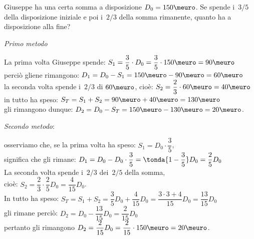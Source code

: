 \begin{esempio}{}{}
Giuseppe ha una certa somma a disposizione \(D_0 = 150\meuro\). 
Se spende i~\(3/5\) della disposizione 
iniziale e poi i~\(2/3\) della somma rimanente, 
quanto ha a disposizione alla fine?

\vspace{.5em}
\emph{Primo metodo} 

La prima volta Giuseppe spende: \quad 
\(S_1 = \dfrac{3}{5} \cdot D_0 =
  \dfrac{3}{5} \cdot 150\meuro = 90\meuro\)\\
perciò gliene rimangono: \quad 
\(D_1 = D_0 - S_1 = 150\meuro - 90\meuro = 60\meuro\) \\
la seconda volta spende i~\(2/3\) di \(60\meuro\), 
cioè: \quad \(S_2 = \dfrac{2}{3} \cdot 60\meuro = 40\meuro\) \\
in tutto ha speso: \quad 
\(S_T = S_1 + S_2 = 90\meuro + 40\meuro = 130\meuro\)\\
gli rimangono dunque: \quad 
\(D_2 = D_0 - S_T = 150\meuro - 130\meuro = 20\meuro\).

\vspace{.5em}
\emph{Secondo metodo}: 

osserviamo che,
se la prima volta ha speso: \quad 
\(S_1 = D_0 \cdot \dfrac{3}{5}\),\\
significa che gli rimane: \quad 
\(D_1 = D_0 - D_0 \cdot \dfrac{3}{5} = 
  \tonda{1-\dfrac{3}{5}} D_0 = \dfrac{2}{5} D_0\) \\ 
La seconda volta spende i~\({2}/{3}\) dei~\({2}/{5}\) della somma, \\
cioè: \quad 
\(S_2 = \dfrac{2}{3} \cdot \dfrac{2}{5} D_0 = \dfrac{4}{15} D_0\).\\
In tutto ha speso: \quad 
\(S_T = S_1 + S_2 = \dfrac{3}{5} D_0 + \dfrac{4}{15} D_0 =
  \dfrac{3\cdot3+4}{15} D_0 =\dfrac{13}{15} D_0\) \\
gli rimane perciò: \quad 
\(D_2 = D_0 - \dfrac{13}{15} D_0 = \dfrac{2}{15} D_0\) \\ 
pertanto gli rimangono \quad 
\(D_2 = \dfrac{2}{15} D_0 = \dfrac{2}{15} \cdot 150\meuro= 20 \meuro\).
\end{esempio}

\pagebreak %

